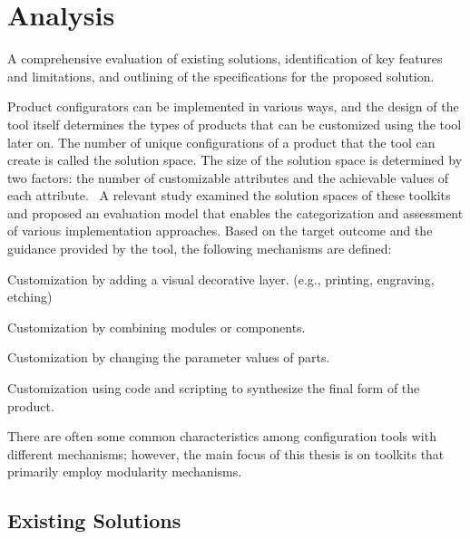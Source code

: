 \chapter{Analysis}

\begin{chapterabstract}
A comprehensive evaluation of existing solutions, identification of key features and limitations, and outlining of the specifications for the proposed solution.
\end{chapterabstract}

Product configurators can be implemented in various ways, and the design of the tool itself determines the types of products that can be customized using the tool later on. The number of unique configurations of a product that the tool can create is called the solution space. The size of the solution space is determined by two factors: the number of customizable attributes and the achievable values of each attribute.~\cite{Huiwen2018} A relevant study examined the solution spaces of these toolkits and proposed an evaluation model that enables the categorization and assessment of various implementation approaches. Based on the target outcome and the guidance provided by the tool, the following mechanisms are defined:~\cite{Hermans2012}

\begin{definition}[Veneer]
Customization by adding a visual decorative layer. (e.g., printing, engraving, etching)
\end{definition}
\begin{definition}[Modularity]
Customization by combining modules or components.
\end{definition}
\begin{definition}[Parametric]
Customization by changing the parameter values of parts.
\end{definition}
\begin{definition}[Generative]
Customization using code and scripting to synthesize the final form of the product.
\end{definition}

There are often some common characteristics among configuration tools with different mechanisms; however, the main focus of this thesis is on toolkits that primarily employ modularity mechanisms.
\newpage

\section{Existing Solutions}
